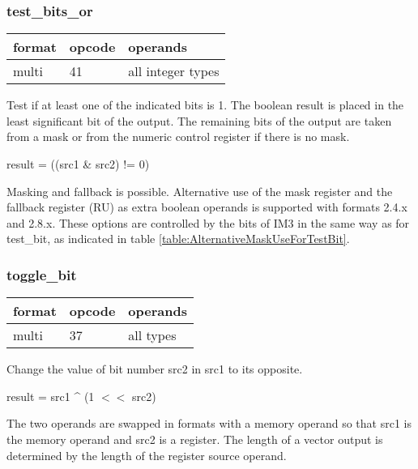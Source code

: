 \documentclass[forwardcom.tex]{subfiles}
\begin{document}
\subsubsection{test\_bits\_or}
\label{table:testBitsOrInstruction}
\begin{tabular}{|p{12mm}|p{12mm}|p{110mm}|}
\hline
\bfseries format & \bfseries opcode & \bfseries operands \\ \hline
multi & 41 & all integer types \\ \hline
\end{tabular}
\vspace{2mm}

Test if at least one of the indicated bits is 1.
The boolean result is placed in the least significant bit of the output. The remaining bits of the output are taken from a mask or from the numeric control register if there is no mask.
\vspace{2mm}

result = ((src1 \& src2) != 0)

\vspace{2mm}
Masking and fallback is possible. Alternative use of the mask register and the fallback register (RU) as extra boolean operands is supported with formats 2.4.x and 2.8.x. These options are controlled by the bits of IM3 in the same way as for test\_bit, as indicated in table \ref{table:AlternativeMaskUseForTestBit}.

\subsubsection{toggle\_bit}
\label{table:toggleBitInstruction}
\begin{tabular}{|p{12mm}|p{12mm}|p{110mm}|}
\hline
\bfseries format & \bfseries opcode & \bfseries operands \\ \hline
multi & 37 & all types \\ \hline
\end{tabular}
\vspace{2mm}

Change the value of bit number src2 in src1 to its opposite.
\vspace{2mm}

result = src1 \^{} (1 $<<$ src2)

\vspace{2mm}
The two operands are swapped in formats with a memory operand so that src1 is the memory operand and src2 is a register. The length of a vector output is determined by the length of the register source operand.
\end{document}
